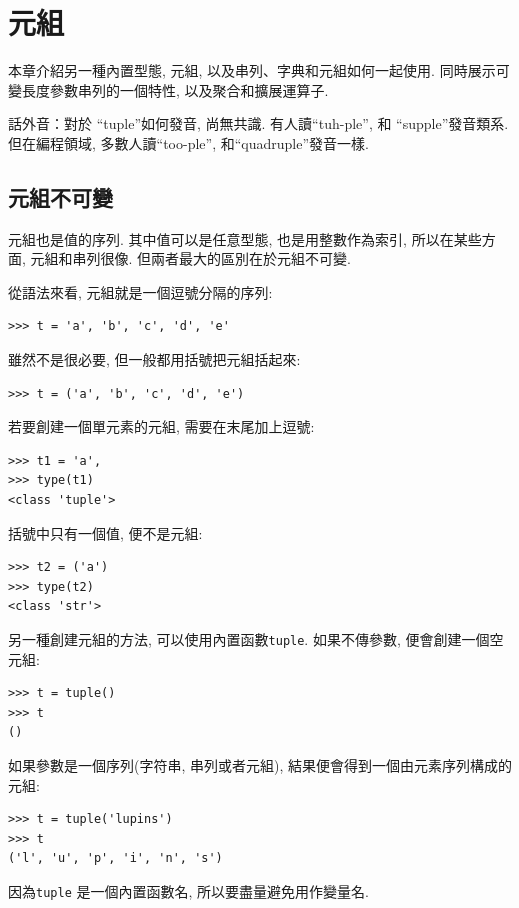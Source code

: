 \documentclass[10pt]{book}
\begin{document}
\chapter{元組}
\label{tuplechap}

本章介紹另一種內置型態, 元組, 以及串列、字典和元組如何一起使用. 
同時展示可變長度參數串列的一個特性, 以及聚合和擴展運算子. 

話外音：對於 ``tuple''如何發音, 尚無共識. 有人讀``tuh-ple'', 
和 ``supple''發音類系. 
但在編程領域, 多數人讀``too-ple'', 和``quadruple''發音一樣. 


\section{元組不可變}

元組也是值的序列. 其中值可以是任意型態, 也是用整數作為索引, 
所以在某些方面, 元組和串列很像. 
但兩者最大的區別在於元組不可變. 

從語法來看, 元組就是一個逗號分隔的序列:

\begin{verbatim}
>>> t = 'a', 'b', 'c', 'd', 'e'
\end{verbatim}
%
雖然不是很必要, 但一般都用括號把元組括起來:

\begin{verbatim}
>>> t = ('a', 'b', 'c', 'd', 'e')
\end{verbatim}
%
若要創建一個單元素的元組, 需要在末尾加上逗號:

\begin{verbatim}
>>> t1 = 'a',
>>> type(t1)
<class 'tuple'>
\end{verbatim}
%
括號中只有一個值, 便不是元組:

\begin{verbatim}
>>> t2 = ('a')
>>> type(t2)
<class 'str'>
\end{verbatim}
%
另一種創建元組的方法, 可以使用內置函數{\tt tuple}. 
如果不傳參數, 便會創建一個空元組:

\begin{verbatim}
>>> t = tuple()
>>> t
()
\end{verbatim}
%
如果參數是一個序列(字符串, 串列或者元組), 
結果便會得到一個由元素序列構成的元組:

\begin{verbatim}
>>> t = tuple('lupins')
>>> t
('l', 'u', 'p', 'i', 'n', 's')
\end{verbatim}
%
因為{\tt tuple} 是一個內置函數名, 
所以要盡量避免用作變量名. 
\end{document}
